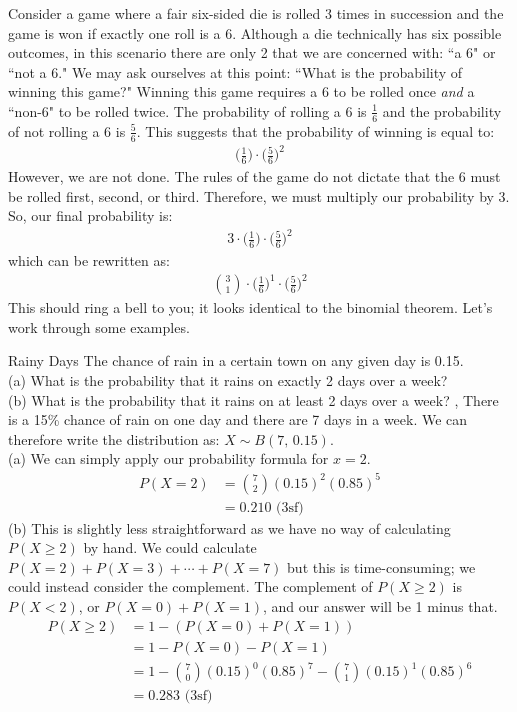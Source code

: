 Consider a game where a fair six-sided die is rolled 3 times in succession and the game is won if exactly one roll is a 6. Although a die technically has six possible outcomes, in this scenario there are only 2 that we are concerned with: ``a 6" or ``not a 6." We may ask ourselves at this point: ``What is the probability of winning this game?" Winning this game requires a 6 to be rolled once \textit{and} a ``non-6" to be rolled twice. The probability of rolling a 6 is $\frac{1}6$ and the probability of not rolling a 6 is $\frac{5}6$. This suggests that the probability of winning is equal to:
\begin{align}
    \bigg(\frac{1}6\bigg) \cdot \bigg(\frac{5}6\bigg)^2
\end{align}
However, we are not done. The rules of the game do not dictate that the 6 must be rolled first, second, or third. Therefore, we must multiply our probability by 3. So, our final probability is:
\begin{align}
    3 \cdot \bigg(\frac{1}6\bigg) \cdot \bigg(\frac{5}6\bigg)^2
\end{align}
which can be rewritten as:
\begin{align}
    \binom{3}{1} \cdot  \bigg(\frac{1}6\bigg)^1 \cdot \bigg(\frac{5}6\bigg)^2
\end{align}
This should ring a bell to you; it looks identical to the binomial theorem. Let's work through some examples.
\begin{example}{Rainy Days}
The chance of rain in a certain town on any given day is 0.15. \\
(a) What is the probability that it rains on exactly 2 days over a week? \\
(b) What is the probability that it rains on at least 2 days over a week?
\sep
There is a 15\% chance of rain on one day and there are 7 days in a week. We can therefore write the distribution as: $X \sim B(7, \, 0.15)$. \\
(a) We can simply apply our probability formula for $x = 2$.
\begin{align}
    P(X=2) &= \binom{7}{2}(0.15)^2(0.85)^5 \\
    &= 0.210 \text{ (3sf)}
\end{align}
(b) This is slightly less straightforward as we have no way of calculating $P(X \geq 2)$ by hand. We could calculate $P(X=2) + P(X=3) + \cdots + P(X=7)$ but this is time-consuming; we could instead consider the complement. The complement of $P(X \geq 2)$ is $P(X < 2)$, or $P(X=0) + P(X=1)$, and our answer will be 1 minus that.
\begin{align}
    P(X \geq 2) &= 1 - (P(X=0) + P(X=1)) \\
    &= 1 - P(X=0) - P(X=1) \\
    &= 1 - \binom{7}{0}(0.15)^0(0.85)^7 - \binom{7}{1}(0.15)^1(0.85)^6 \\
    &= 0.283 \text{ (3sf)}
\end{align}
\end{example}

